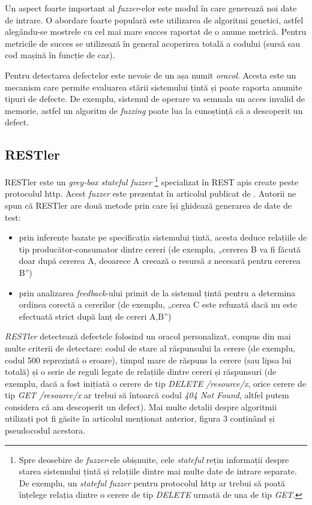 Un aspect foarte important al \textit{fuzzer}-elor este modul în care generează noi date de intrare. O abordare foarte populară este utilizarea de algoritmi genetici, astfel alegându-se mostrele cu cel mai mare succes raportat de o anume metrică. Pentru metricile de succes se utilizează în general acoperirea totală a codului (sursă sau cod mașină în funcție de caz).

Pentru detectarea defectelor este nevoie de un așa numit \textit{oracol}. Acesta este un mecanism care permite evaluarea stării sistemului țintă și poate raporta anumite tipuri de defecte. De exemplu, sistemul de operare va semnala un acces invalid de memorie, astfel un algoritm de \textit{fuzzing} poate lua la cunoștință că a descoperit un defect.

\subsection{RESTler}

RESTler este un \textit{grey-box stateful fuzzer} \footnote{Spre deosebire de \textit{fuzzer}-ele obișnuite, cele \textit{stateful} rețin informații despre starea sistemului țintă și relațiile dintre mai multe date de intrare separate. De exemplu, un \textit{stateful fuzzer} pentru protocolul \acrshort{http} ar trebui să poată înțelege relația dintre o cerere de tip \textit{DELETE} urmată de una de tip \textit{GET}.} specializat în REST \acrshort{api}s create peste protocolul \acrshort{http}. Acest \textit{fuzzer} este prezentat în articolul publicat de \citet{Atlidakis2019}. Autorii ne spun că RESTler are două metode prin care își ghidează generarea de date de test:

\begin{itemize}
    \item prin inferențe bazate pe specificația sistemului țintă, acesta deduce relațiile de tip producător-consumator dintre cereri (de exemplu, „cererea B va fi făcută doar după cererea A, deoarece A creează o resursă \textit{x} necesară pentru cererea B”)
    \item prin analizarea \textit{feedback}-ului primit de la sistemul țintă pentru a determina ordinea corectă a cererilor (de exemplu, „cerea C este refuzată dacă nu este efectuată strict după lanț de cereri A,B”)
\end{itemize}

\textit{RESTler} detectează defectele folosind un oracol personalizat, compus din mai multe criterii de detectare: codul de stare al răspunsului la cerere (de exemplu, codul 500 reprezintă o eroare), timpul mare de răspuns la cerere (sau lipsa lui totală) și o serie de reguli legate de relațiile dintre cereri și răspunsuri (de exemplu, dacă a fost inițiată o cerere de tip \textit{DELETE /resource/x}, orice cerere de tip \textit{GET /resource/x} ar trebui să întoarcă codul \textit{404 Not Found}, altfel putem considera că am descoperit un defect). Mai multe detalii despre algoritmii utilizați pot fi găsite în articolul menționat anterior, figura 3 conținând și pseudocodul acestora.

